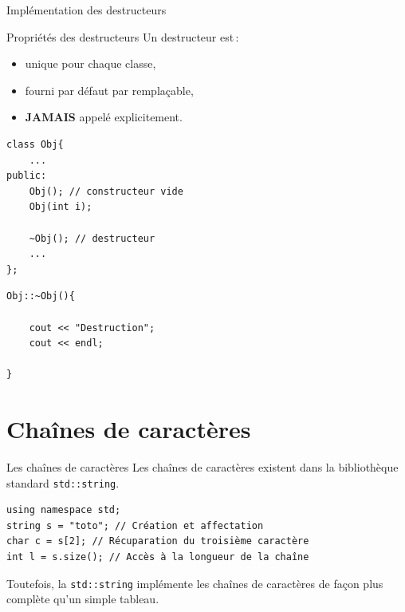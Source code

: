 \begin{frame}[fragile=singleslide]{Implémentation des destructeurs}
    \begin{block}{Propriétés des destructeurs}
    Un destructeur est\,:
    \begin{itemize}
        \item unique pour chaque classe,
        \item fourni par défaut par remplaçable,
        \item \textbf{JAMAIS} appelé explicitement.
    \end{itemize}
    \end{block}

    \begin{minipage}{0.48\linewidth}
            \begin{verbatim}
class Obj{
    ...
public:
    Obj(); // constructeur vide
    Obj(int i);

    ~Obj(); // destructeur
    ...
};
            \end{verbatim}
    \end{minipage}
    \hfill
    \begin{minipage}{0.50\linewidth}
            \begin{verbatim}
Obj::~Obj(){

    cout << "Destruction";
    cout << endl;

}
            \end{verbatim}
    \end{minipage}
\end{frame}


\section{Chaînes de caractères}

\begin{frame}[fragile]{Les chaînes de caractères}
    Les chaînes de caractères existent dans la bibliothèque standard \texttt{std::string}.
    \begin{verbatim}
using namespace std;
string s = "toto"; // Création et affectation
char c = s[2]; // Récuparation du troisième caractère
int l = s.size(); // Accès à la longueur de la chaîne
    \end{verbatim}

    Toutefois, la \texttt{std::string} implémente les chaînes de caractères de façon plus complète qu'un simple tableau.
\end{frame}

